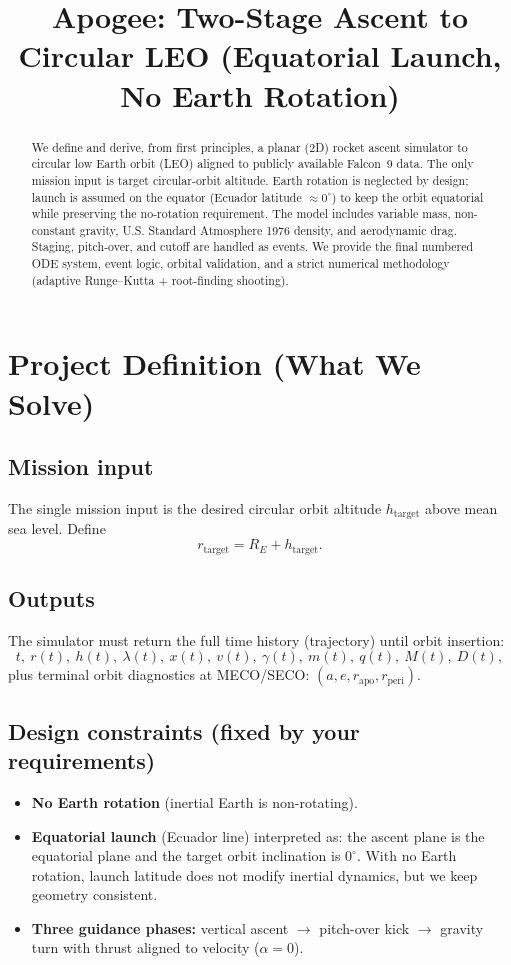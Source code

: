 \documentclass[11pt]{article}
\title{Apogee: Two-Stage Ascent to Circular LEO (Equatorial Launch, No Earth Rotation)}
\author{}
\date{}
\begin{document}
\maketitle

\begin{abstract}
We define and derive, from first principles, a planar (2D) rocket ascent simulator to circular low Earth orbit (LEO) aligned to publicly available Falcon~9 data. The only mission input is target circular-orbit altitude. Earth rotation is neglected by design; launch is assumed on the equator (Ecuador latitude $\approx 0^\circ$) to keep the orbit equatorial while preserving the no-rotation requirement. The model includes variable mass, non-constant gravity, U.S. Standard Atmosphere 1976 density, and aerodynamic drag. Staging, pitch-over, and cutoff are handled as events. We provide the final numbered ODE system, event logic, orbital validation, and a strict numerical methodology (adaptive Runge--Kutta + root-finding shooting).
\end{abstract}

\section{Project Definition (What We Solve)}
\subsection{Mission input}
The single mission input is the desired circular orbit altitude $h_{\text{target}}$ above mean sea level. Define
\begin{equation}
r_{\text{target}} = R_E + h_{\text{target}}.
\end{equation}

\subsection{Outputs}
The simulator must return the full time history (trajectory) until orbit insertion:
\[
t,\ r(t),\ h(t),\ \lambda(t),\ x(t),\ v(t),\ \gamma(t),\ m(t),\ q(t),\ M(t),\ D(t),
\]
plus terminal orbit diagnostics at MECO/SECO: $(a,e,r_{\text{apo}},r_{\text{peri}})$.

\subsection{Design constraints (fixed by your requirements)}
\begin{itemize}
\item \textbf{No Earth rotation} (inertial Earth is non-rotating).
\item \textbf{Equatorial launch} (Ecuador line) interpreted as: the ascent plane is the equatorial plane and the target orbit inclination is $0^\circ$. With no Earth rotation, launch latitude does not modify inertial dynamics, but we keep geometry consistent.
\item \textbf{Three guidance phases:} vertical ascent $\rightarrow$ pitch-over kick $\rightarrow$ gravity turn with thrust aligned to velocity ($\alpha=0$).
\end{itemize}
\end{document}
